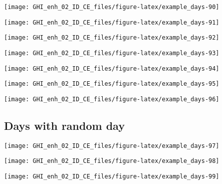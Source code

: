 \documentclass[
  10pt,
  a4paper,oneside]{article}
\begin{document}
\begin{center}\texttt{[image: GHI\_enh\_02\_ID\_CE\_files/figure-latex/example\_days-90]} \end{center}

\begin{center}\texttt{[image: GHI\_enh\_02\_ID\_CE\_files/figure-latex/example\_days-91]} \end{center}

\begin{center}\texttt{[image: GHI\_enh\_02\_ID\_CE\_files/figure-latex/example\_days-92]} \end{center}

\begin{center}\texttt{[image: GHI\_enh\_02\_ID\_CE\_files/figure-latex/example\_days-93]} \end{center}

\begin{center}\texttt{[image: GHI\_enh\_02\_ID\_CE\_files/figure-latex/example\_days-94]} \end{center}

\begin{center}\texttt{[image: GHI\_enh\_02\_ID\_CE\_files/figure-latex/example\_days-95]} \end{center}

\begin{center}\texttt{[image: GHI\_enh\_02\_ID\_CE\_files/figure-latex/example\_days-96]} \end{center}

\FloatBarrier

\hypertarget{days-with-random-day}{%
\subsection{Days with random day}\label{days-with-random-day}}

\begin{center}\texttt{[image: GHI\_enh\_02\_ID\_CE\_files/figure-latex/example\_days-97]} \end{center}

\begin{center}\texttt{[image: GHI\_enh\_02\_ID\_CE\_files/figure-latex/example\_days-98]} \end{center}

\begin{center}\texttt{[image: GHI\_enh\_02\_ID\_CE\_files/figure-latex/example\_days-99]} \end{center}
\end{document}
